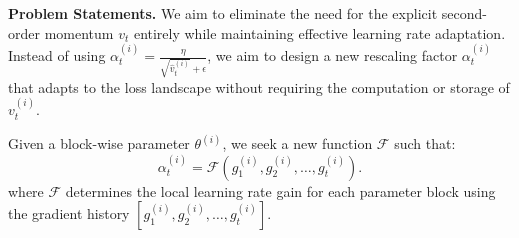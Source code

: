 \textbf{Problem Statements.} We aim to eliminate the need for the explicit second-order momentum $v_t$ entirely while maintaining effective learning rate adaptation. Instead of using $\alpha^{(i)}_t = \frac{\eta}{\sqrt{\hat{v}^{(i)}_t} + \epsilon}$, we aim to design a new rescaling factor $\alpha^{(i)}_t$ that adapts to the loss landscape without requiring the computation or storage of $v^{(i)}_t$.

Given a block-wise parameter $\theta^{(i)}$, we seek a new function $\mathcal{F}$ such that:
\begin{equation}
    \alpha^{(i)}_t = \mathcal{F}(g^{(i)}_1, g^{(i)}_2, \dots, g^{(i)}_t).
\end{equation}
where $\mathcal{F}$ determines the local learning rate gain for each parameter block using the gradient history $[g^{(i)}_1, g^{(i)}_2, \dots, g^{(i)}_t]$. 

